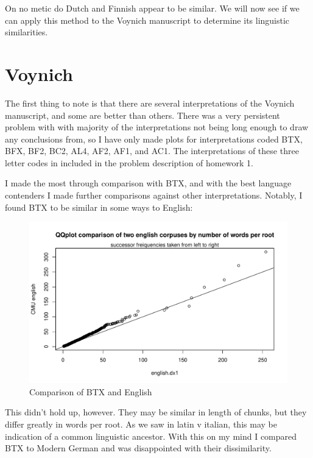 \documentclass{article}
\begin{document}
On no metic do Dutch and Finnish appear to be similar. We will now see if we can apply this method to the Voynich manuscript to determine its linguistic similarities.


\section{Voynich}

The first thing to note is that there are several interpretations of the Voynich manuscript, and some are better than others. There was a very persistent problem with with majority of the interpretations not being long enough to draw any conclusions from, so I have only made plots for interpretations coded BTX, BFX, BF2, BC2, AL4, AF2, AF1, and AC1. The interpretations of these three letter codes in included in the problem description of homework 1. 

I made the most through comparison with BTX, and with the best language contenders I made further comparisons against other interpretations. Notably, I found BTX to be similar in some ways to English:

		\begin{figure}[H]
		\centering
		\caption{Comparison of BTX and English}
		\includegraphics[scale=.7,page=12]{plots.pdf}
		\end{figure}

This didn't hold up, however. They may be similar in length of chunks, but they differ greatly in words per root. As we saw in latin v italian, this may be indication of a common linguistic ancestor. With this on my mind I compared BTX to Modern German and was disappointed with their dissimilarity. 
\end{document}

